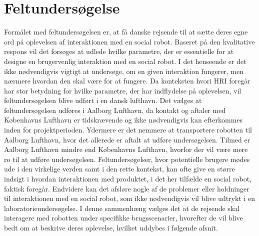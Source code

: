 \chapter{Feltundersøgelse}
\label{Feltundersoegelse}
%
Formålet med feltundersøgelsen er, at få danske rejsende til at sætte deres egne ord på oplevelsen af interaktionen med en social robot. Baseret på den kvalitative respons vil det forsøges at udlede hvilke parametre, der er essentielle for at designe en brugervenlig interaktion med en social robot. I det henseende er det ikke nødvendigvis vigtigt at undersøge, om en given interaktion fungerer, men nærmere hvordan den skal være for at fungere. Da konteksten hvori HRI foregår har stor betydning for hvilke parametre, der har indflydelse på oplevelsen, vil feltundersøgelsen blive udført i en dansk lufthavn. Det vælges at feltundersøgelsen udføres i Aalborg Lufthavn, da kontakt og aftaler med Københavns Lufthavn er tidskrævende og ikke nødvendigvis kan efterkommes inden for projektperioden. Ydermere er det nemmere at transportere robotten til Aalborg Lufthavn, hvor det allerede er aftalt at udføre undersøgelsen. Tilmed er Aalborg Lufthavn mindre end Københavns Lufthavn, hvorfor der vil være mere ro til at udføre undersøgelsen.\blankline
%
Feltundersøgelser, hvor potentielle brugere mødes ude i den virkelige verden samt i den rette kontekst, kan ofte give en større indsigt i hvordan interaktionen med produktet, i det her tilfælde en social robot, faktisk foregår. Endvidere kan det afsløre nogle af de problemer eller holdninger til interaktionen med en social robot, som ikke nødvendigvis vil blive udtrykt i en laboratorieundersøgelse. I denne sammenhæng vælges det at de rejsende skal interagere med robotten under specifikke brugsscenarier, hvorefter de vil blive bedt om at beskrive deres oplevelse, hvilket uddybes i følgende afsnit.   
